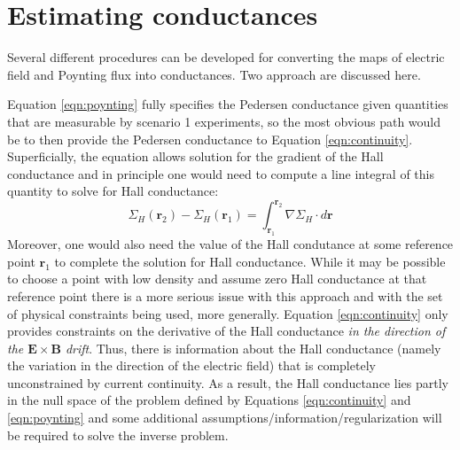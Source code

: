 \documentclass[11pt,letterpaper]{article}
\begin{document}
\section{Estimating conductances}

Several different procedures can be developed for converting the maps of electric field and Poynting flux into conductances. Two approach are discussed here.   

Equation \ref{eqn:poynting} fully specifies the Pedersen conductance given quantities that are measurable by scenario 1 experiments, so the most obvious path would be to then provide the Pedersen conductance to Equation \ref{eqn:continuity}.  Superficially, the equation allows solution for the gradient of the Hall conductance and in principle one would need to compute a line integral of this quantity to solve for Hall conductance:
\begin{equation}
\Sigma_H(\mathbf{r}_2)-\Sigma_H(\mathbf{r}_1) = \int_{\mathbf{r}_1}^{\mathbf{r}_2} \nabla \Sigma_H \cdot d \mathbf{r}
\end{equation}
Moreover, one would also need the value of the Hall condutance at some reference point $\mathbf{r}_1$ to complete the solution for Hall conductance.  While it may be possible to choose a point with low density and assume zero Hall conductance at that reference point there is a more serious issue with this approach and with the set of physical constraints being used, more generally.  Equation \ref{eqn:continuity} only provides constraints on the derivative of the Hall conductance \emph{in the direction of the $\mathbf{E} \times \mathbf{B}$ drift}.  Thus, there is information about the Hall conductance (namely the variation in the direction of the electric field) that is completely unconstrained by current continuity.  As a result, the Hall conductance lies partly in the null space of the problem defined by Equations \ref{eqn:continuity} and \ref{eqn:poynting} and some additional assumptions/information/regularization will be required to solve the inverse problem.  
\end{document}

